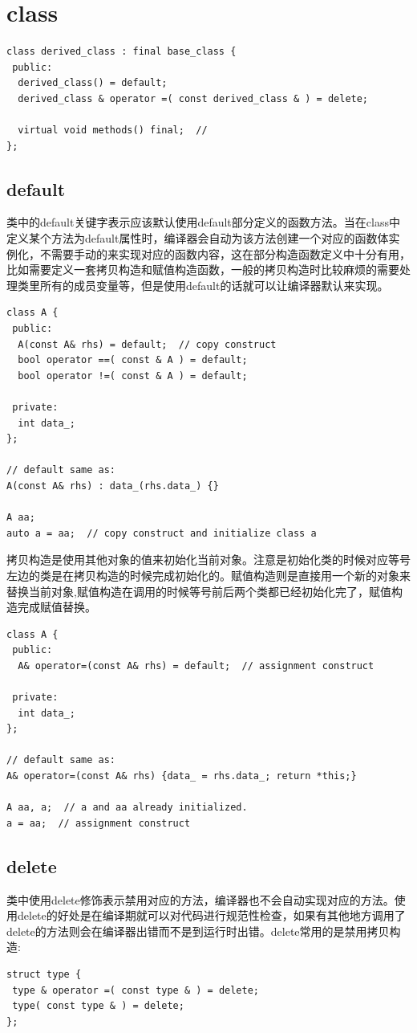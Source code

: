 \documentclass[12pt]{book}
\begin{document}
\section{class}
\begin{lstlisting}
class derived_class : final base_class {
 public:
  derived_class() = default;
  derived_class & operator =( const derived_class & ) = delete;
  
  virtual void methods() final;	 //
};
\end{lstlisting}

\subsection{default}
类中的default关键字表示应该默认使用default部分定义的函数方法。当在class中定义某个方法为default属性时，编译器会自动为该方法创建一个对应的函数体实例化，不需要手动的来实现对应的函数内容，这在部分构造函数定义中十分有用，比如需要定义一套拷贝构造和赋值构造函数，一般的拷贝构造时比较麻烦的需要处理类里所有的成员变量等，但是使用default的话就可以让编译器默认来实现。
\begin{lstlisting}
class A {
 public:
  A(const A& rhs) = default;  // copy construct
  bool operator ==( const & A ) = default;
  bool operator !=( const & A ) = default;
  
 private:
  int data_;
};

// default same as:
A(const A& rhs) : data_(rhs.data_) {}

A aa;
auto a = aa;  // copy construct and initialize class a
\end{lstlisting}
拷贝构造是使用其他对象的值来初始化当前对象。注意是初始化类的时候对应等号左边的类是在拷贝构造的时候完成初始化的。赋值构造则是直接用一个新的对象来替换当前对象,赋值构造在调用的时候等号前后两个类都已经初始化完了，赋值构造完成赋值替换。
\begin{lstlisting}
class A {
 public:
  A& operator=(const A& rhs) = default;  // assignment construct

 private:
  int data_;
};
	
// default same as:
A& operator=(const A& rhs) {data_ = rhs.data_; return *this;}
	
A aa, a;  // a and aa already initialized.
a = aa;  // assignment construct
\end{lstlisting}

\subsection{delete}
类中使用delete修饰表示禁用对应的方法，编译器也不会自动实现对应的方法。使用delete的好处是在编译期就可以对代码进行规范性检查，如果有其他地方调用了delete的方法则会在编译器出错而不是到运行时出错。delete常用的是禁用拷贝构造:
\begin{lstlisting}
struct type {
 type & operator =( const type & ) = delete;
 type( const type & ) = delete;
};
\end{lstlisting}
\end{document}
